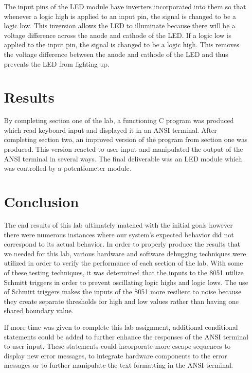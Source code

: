 \documentclass[12pt]{article}
\begin{document}
The input pins of the LED module have inverters incorporated into them so that whenever a logic high is applied to an input pin, the signal is changed to be a logic low. This inversion allows the LED to illuminate because there will be a voltage difference across the anode and cathode of the LED. If a logic low is applied to the input pin, the signal is changed to be a logic high. This removes the voltage difference between the anode and cathode of the LED and thus prevents the LED from lighting up. 
 
\section{Results}

By completing section one of the lab, a functioning C program was produced which read keyboard input and displayed it in an ANSI terminal. After completing section two, an improved version of the program from section one was produced. This version reacted to user input and manipulated the output of the ANSI terminal in several ways. The final deliverable was an LED module which was controlled by a potentiometer module. 

\section{Conclusion}

The end results of this lab ultimately matched with the initial goals however there were numerous instances where our system’s expected behavior did not correspond to its actual behavior. In order to properly produce the results that we needed for this lab, various hardware and software debugging techniques were utilized in order to verify the performance of each section of the lab. With some of these testing techniques, it was determined that the inputs to the 8051 utilize Schmitt triggers in order to prevent oscillating logic highs and logic lows. The use of Schmitt triggers makes the inputs of the 8051 more resilient to noise because they create separate thresholds for high and low values rather than having one shared boundary value. 

If more time was given to complete this lab assignment, additional conditional statements could be added to further enhance the responses of the ANSI terminal to user input. These statements could incorporate more escape sequences to display new error messages, to integrate hardware components to the error messages or to further manipulate the text formatting in the ANSI terminal. 
\end{document}
